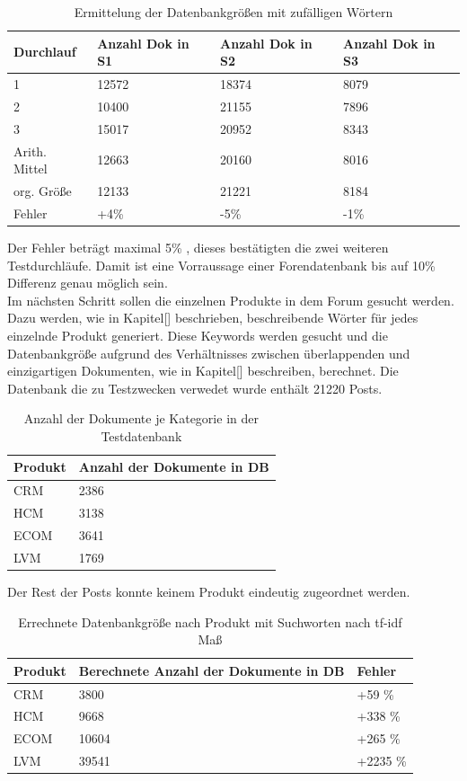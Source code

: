 \begin{table}[h!]
\begin{tabular}{ | p{3cm} | p{3cm} | p{3cm}| p{3cm} |} \hline
Durchlauf & Anzahl Dok in S1 & Anzahl Dok in S2 & Anzahl Dok in S3 \\ \hline
1 & 12572  & 18374 & 8079 \\ \hline
2 & 10400 & 21155 & 7896 \\ \hline
3 & 15017 & 20952 & 8343  \\ \hline
Arith. Mittel & 12663 & 20160 & 8016 \\ \hline
org. Größe & 12133 & 21221 & 8184 \\ \hline
Fehler & +4\% & -5\% & -1\% \\ \hline
\end{tabular}
\caption{Ermittelung der Datenbankgrößen mit zufälligen Wörtern}
\end{table}

\newpage

Der Fehler beträgt maximal 5\% , dieses bestätigten die zwei weiteren Testdurchläufe. Damit ist eine Vorraussage einer Forendatenbank bis auf 10\% Differenz genau möglich sein.\\

Im nächsten Schritt sollen die einzelnen Produkte in dem Forum gesucht werden. Dazu werden, wie in Kapitel[] beschrieben, beschreibende Wörter für jedes einzelnde Produkt generiert. Diese Keywords werden gesucht und die Datenbankgröße aufgrund des Verhältnisses zwischen überlappenden und einzigartigen Dokumenten, wie in Kapitel[] beschreiben, berechnet. Die Datenbank die zu Testzwecken verwedet wurde enthält 21220 Posts.

\begin{table}[h!]
\begin{tabular}{ | p{3cm} | l |}
\hline
Produkt & Anzahl der Dokumente in DB \\ \hline
CRM & 2386 \\ \hline
HCM & 3138 \\ \hline
ECOM & 3641  \\ \hline
LVM & 1769 \\ \hline
\end{tabular}
\caption{Anzahl der Dokumente je Kategorie in der Testdatenbank}
\end{table}

Der Rest der Posts konnte keinem Produkt eindeutig zugeordnet werden.
\newpage

\begin{table}[h!]
\begin{tabular}{ | p{3cm} | l | l |}
\hline
Produkt & Berechnete Anzahl der Dokumente in DB & Fehler\\ \hline
CRM & 3800 & +59 \%\\ \hline
HCM & 9668 & +338 \% \\ \hline
ECOM & 10604  & +265 \%\\ \hline
LVM & 39541 & +2235 \%\\ \hline
\end{tabular}
\caption{Errechnete Datenbankgröße nach Produkt mit Suchworten nach tf-idf Maß}
\end{table}

